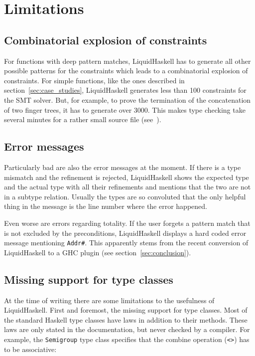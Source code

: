 \documentclass[acmlarge,screen,authorversion=true,nonacm=true]{acmart}
\begin{document}
\section{Limitations}\label{sec:limitations}

\subsection{Combinatorial explosion of constraints}

For functions with deep pattern matches, LiquidHaskell has to generate all other possible patterns for the constraints which leads to a combinatorial explosion of constraints. For simple functions, like the ones described in section~\ref{sec:case_studies}, LiquidHaskell generates less than 100 constraints for the SMT solver. But, for example, to prove the termination of the concatenation of two finger trees, it has to generate over 3000. This makes type checking take several minutes for a rather small source file (see~\cite{amortized}).

\subsection{Error messages}

Particularly bad are also the error messages at the moment. If there is a type mismatch and the refinement is rejected, LiquidHaskell shows the expected type and the actual type with all their refinements and mentions that the two are not in a subtype relation. Usually the types are so convoluted that the only helpful thing in the message is the line number where the error happened.

Even worse are errors regarding totality. If the user forgets a pattern match that is not excluded by the preconditions, LiquidHaskell displays a hard coded error message mentioning \texttt{Addr\#}. This apparently stems from the recent conversion of LiquidHaskell to a GHC plugin (see section~\ref{sec:conclusion}).

\subsection{Missing support for type classes}

At the time of writing there are some limitations to the usefulness of LiquidHaskell. First and foremost, the missing support for type classes. Most of the standard Haskell type classes have laws in addition to their methods. These laws are only stated in the documentation, but never checked by a compiler. For example, the \texttt{Semigroup} type class specifies that the combine operation (\texttt{<>}) has to be associative:
\end{document}
